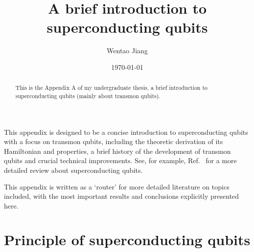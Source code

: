 \documentclass[%
groupedaddress,
showpacs,
 amsmath,amssymb,
 aps,
prb,
]{revtex4-1}
\begin{document}

\title{A brief introduction to superconducting qubits}%

% 
\author{Wentao Jiang}%

\date{\today}

\begin{abstract}
This is the Appendix A of my undergraduate thesis, a brief introduction to superconducting qubits (mainly about transmon qubits).
\end{abstract}

\maketitle

\tableofcontents




This appendix is designed to be a concise introduction to superconducting qubits with a focus on transmon qubits, including the theoretic derivation of its Hamiltonian and properties, a brief history of the development of transmon qubits and crucial technical improvements. See, for example, Ref.~ for a more detailed review about superconducting qubits.

This appendix is written as a `router' for more detailed literature on topics included, with the most important results and conclusions explicitly presented here.

\section{Principle of superconducting qubits} %
\label{sec:principle_of_superconducting_qubit}
    
\end{document}
